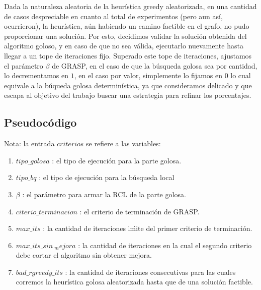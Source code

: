 Dada la naturaleza aleatoria de la heur\'istica greedy aleatorizada, en una cantidad de casos despreciable en cuanto al total de experimentos (pero aun as\'i, ocurrieron), la heur\'istica, a\'un habiendo un camino factible en el grafo, no pudo proporcionar una soluci\'on. Por esto, decidimos validar la soluci\'on obtenida del algoritmo goloso, y en caso de que no sea v\'alida, ejecutarlo nuevamente hasta llegar a un tope de iteraciones fijo. Superado este tope de iteraciones, ajustamos el par\'ametro $\beta$ de GRASP, en el caso de que la b\'usqueda golosa sea por cantidad, lo decrementamos en $1$, en el caso por valor, simplemente lo fijamos en $0$ lo cual equivale a la b\'uqueda golosa determin\'istica, ya que consideramos delicado y que escapa al objetivo del trabajo buscar una estrategia para refinar los porcentajes.


\subsection{Pseudoc\'odigo}

Nota: la entrada $criterios$ se refiere a las variables:

\begin{enumerate}
\item $tipo\_golosa$ : el tipo de ejecuci\'on para la parte golosa.
\item $tipo\_bq$ : el tipo de ejecuci\'on para la b\'usqueda local
\item $\beta$ : el par\'ametro para armar la RCL de la parte golosa.
\item $citerio\_terminacion$ : el criterio de terminaci\'on de GRASP.
\item $max\_its$ : la cantidad de iteraciones l\'mite del primer criterio de terminaci\'on.
\item $max\_its\_sin\ _mejora$ : la cantidad de iteraciones en la cual el segundo criterio debe cortar el algoritmo sin obtener mejora.
\item $bad\_rgreedy\_its$ : la cantidad de iteraciones consecutivas para las cuales corremos la heur\'istica golosa aleatorizada hasta que de una soluci\'on factible.
\end{enumerate}

